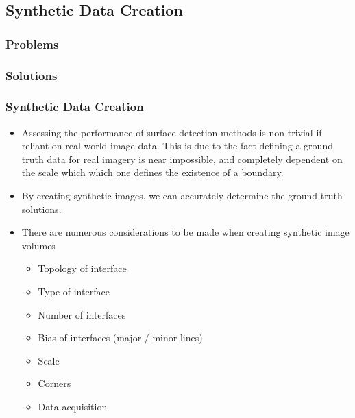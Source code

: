 \documentclass[9pt]{beamer}
\begin{document}
	\subsection{Synthetic Data Creation}
\begin{frame}
	\frametitle{Problems}
\end{frame}
\begin{frame}
	\frametitle{Solutions}
\end{frame}
\begin{frame}
	\frametitle{Synthetic Data Creation}
	\begin{itemize}
	\item Assessing the performance of surface detection methods is non-trivial if reliant on real world image data. This is due to the fact defining a ground truth data for real imagery is near impossible, and completely dependent on the scale which which one defines the existence of a boundary.
	\item By creating synthetic images, we can accurately determine the ground truth solutions.
	\item There are numerous considerations to be made when creating synthetic image volumes
	\begin{itemize}
	\item Topology of interface 
	\item Type of interface
	\item Number of interfaces
	\item Bias of interfaces (major / minor lines)
	\item Scale
	\item Corners
	\item Data acquisition
	\end{itemize}
	\end{itemize}
	\end{frame}
\end{document}
